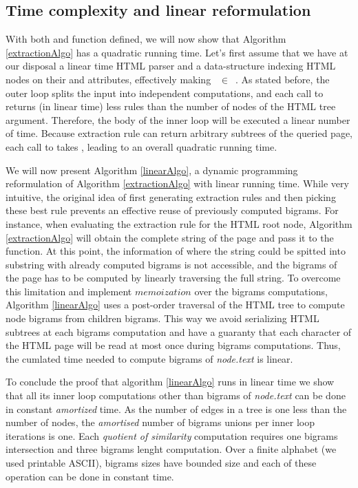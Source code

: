 \similarityAlgo


\subsection{Time complexity and linear reformulation}
With both  and  function defined, we will now show that Algorithm \ref{extractionAlgo} has a quadratic running time. Let's first assume that we have at our disposal a linear time HTML parser and a data-structure indexing HTML nodes on their  and  attributes, effectively making ~$\in$~. As stated before, the outer loop splits the input into independent computations, and each call to  returns (in linear time) less rules than the number of nodes of the HTML tree argument. Therefore, the body of the inner loop will be executed a linear number of time. Because extraction rule can return arbitrary subtrees of the queried page, each call to  takes , leading to an overall quadratic running time.

\linearAlgo

We will now present Algorithm \ref{linearAlgo}, a dynamic programming reformulation of Algorithm \ref{extractionAlgo} with linear running time. While very intuitive, the original idea of first generating extraction rules and then picking these best rule prevents an effective reuse of previously computed bigrams. For instance, when evaluating the extraction rule for the HTML root node, Algorithm \ref{extractionAlgo} will obtain the complete string of the page and pass it to the  function. At this point, the information of where the string could be spitted into substring with already computed bigrams is not accessible, and the bigrams of the page has to be computed by linearly traversing the full string. To overcome this limitation and implement $memoization$ over the bigrams computations, Algorithm \ref{linearAlgo} uses a post-order traversal of the HTML tree to compute node bigrams from children bigrams. This way we avoid serializing HTML subtrees at each bigrams computation and have a guaranty that each character of the HTML page will be read at most once during bigrams computations. Thus, the cumlated time needed to compute bigrams of \emph{node.text} is linear.

To conclude the proof that algorithm \ref{linearAlgo} runs in linear time we show that all its inner loop computations other than bigrams of \emph{node.text} can be done in constant \emph{amortized} time. As the number of edges in a tree is one less than the number of nodes, the \emph{amortised} number of bigrams unions per inner loop iterations is one. Each \emph{quotient of similarity} computation requires one bigrams intersection and three bigrams lenght computation. Over a finite alphabet (we used printable ASCII), bigrams sizes have bounded size and each of these operation can be done in constant time.


